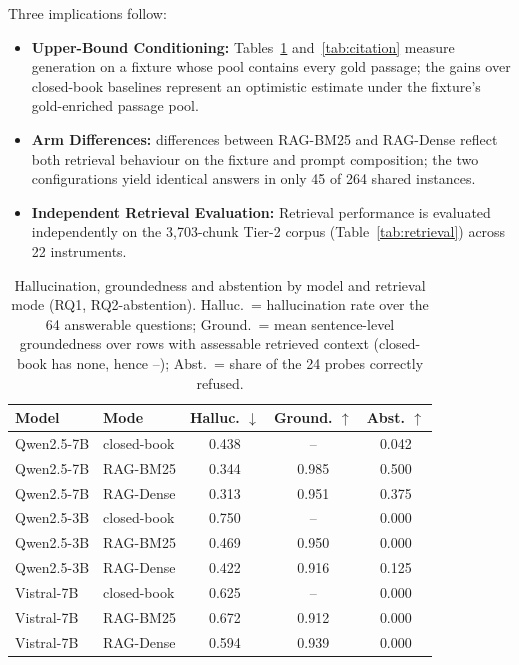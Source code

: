\documentclass[conference,a4paper]{IEEEtran}
\begin{document}
Three implications follow:
\begin{itemize}
\item \textbf{Upper-Bound Conditioning:} Tables~\ref{tab:main} and~\ref{tab:citation} measure generation on a fixture whose pool contains every gold passage; the gains over closed-book baselines represent an optimistic estimate under the fixture's gold-enriched passage pool.
\item \textbf{Arm Differences:} differences between RAG-BM25 and RAG-Dense reflect both retrieval behaviour on the fixture and prompt composition; the two configurations yield identical answers in only 45 of 264 shared instances.
\item \textbf{Independent Retrieval Evaluation:} Retrieval performance is evaluated independently on the 3,703-chunk Tier-2 corpus (Table~\ref{tab:retrieval}) across 22 instruments.
\end{itemize}

\begin{table}[t]
\centering
\caption{Hallucination, groundedness and abstention by model and retrieval mode (RQ1, RQ2-abstention). Halluc.\ = hallucination rate over the 64 answerable questions; Ground.\ = mean sentence-level groundedness over rows with assessable retrieved context (closed-book has none, hence --); Abst.\ = share of the 24 probes correctly refused.}
\label{tab:main}
\begin{tabular}{@{}llccc@{}}
\toprule
Model & Mode & Halluc. $\downarrow$ & Ground. $\uparrow$ & Abst. $\uparrow$ \\
\midrule
Qwen2.5-7B  & closed-book & 0.438 & --    & 0.042 \\
Qwen2.5-7B  & RAG-BM25    & 0.344 & 0.985 & 0.500 \\
Qwen2.5-7B  & RAG-Dense   & 0.313 & 0.951 & 0.375 \\
Qwen2.5-3B  & closed-book & 0.750 & --    & 0.000 \\
Qwen2.5-3B  & RAG-BM25    & 0.469 & 0.950 & 0.000 \\
Qwen2.5-3B  & RAG-Dense   & 0.422 & 0.916 & 0.125 \\
Vistral-7B  & closed-book & 0.625 & --    & 0.000 \\
Vistral-7B  & RAG-BM25    & 0.672 & 0.912 & 0.000 \\
Vistral-7B  & RAG-Dense   & 0.594 & 0.939 & 0.000 \\
\bottomrule
\end{tabular}
\end{table}
\end{document}

